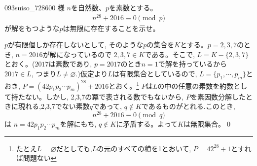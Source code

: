 \begin{prob}{093}{}{suiso\_728600 様}
 $n$を自然数、$p$を素数とする。
 \begin{align*}
  n^{28}+2016 \equiv 0 \pmod p
 \end{align*}
 が解をもつような$p$は無限に存在することを示せ。
\end{prob}
$p$が有限個しか存在しないとして, そのような$p$の集合を$K$とする。$p=2,3,7$のとき, $n=2016$が解になっているので $2,3,7\in K$である。そこで, $L=K-\{2,3,7\}$とおく。($2017$は素数であり, $p=2017$のとき$n=1$で解を持っているから $2017\in L$, つまり$L\neq \varnothing$.)仮定より$L$は有限集合としているので, $L=\{p_1,\cdots, p_m\}$とおき, $P=(42p_1p_2\cdots p_m)^{28} +2016$とおく。\footnote{たとえ$L=\varnothing$だとしても,$L$の元のすべての積を1とおいて, $P=42^{28}+1$とすれば問題ない} $P$は$L$の中の任意の素数を約数として持たない。しかし, 2,3,7の冪で表される数でもないから, $P$を素因数分解したときに現れる,2,3,7でない素数$q$であって, $q\notin K$であるものがとれる.このとき,  
\[n^{28}+2016\equiv 0 \pmod{q} \]
は $n=42p_1p_2\cdots p_m$を解にもち, $q\notin K$に矛盾する。よって$K$は無限集合。\qed

